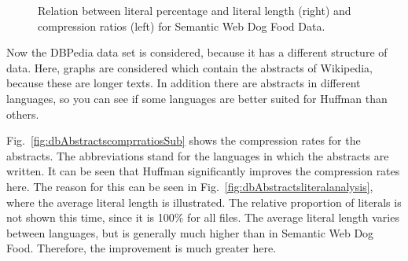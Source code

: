 \begin{figure}[h]
	\centering
	\hfill
	\caption{Relation between literal percentage and literal length (right) and compression ratios (left) for Semantic Web Dog Food Data.}
	\label{fig:dogfood}
\end{figure}

Now the DBPedia data set is considered, because it has a different structure of data. Here, graphs are considered which contain the abstracts of Wikipedia, because these are longer texts. In addition there are abstracts in different languages, so you can see if some languages are better suited for Huffman than others.

Fig.~\ref{fig:dbAbstractscomprratiosSub} shows the compression rates for the abstracts. The abbreviations stand for the languages in which the abstracts are written. It can be seen that Huffman significantly improves the compression rates here. The reason for this can be seen in Fig.~\ref{fig:dbAbstractsliteralanalysis}, where the average literal length is illustrated. The relative proportion of literals is not shown this time, since it is 100\% for all files. The average literal length varies between languages, but is generally much higher than in Semantic Web Dog Food. Therefore, the improvement is much greater here.


